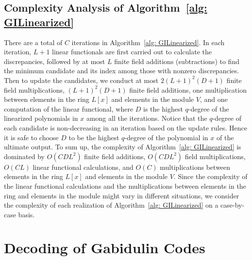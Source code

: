 \documentclass[11pt,onecolumn,draftcls]{IEEEtran}
\begin{document}
\subsection{Complexity Analysis of Algorithm~\ref{alg: GILinearized}} \label{section: ComplexityGeneral}
There are a total of $C$ iterations in Algorithm~\ref{alg: GILinearized}. In each iteration, $L+1$ linear functionals are first carried out to calculate the discrepancies, followed by at most $L$ finite field additions (subtractions) to find the minimum candidate and its index among those with nonzero discrepancies. Then to update the candidates, we conduct at most $2(L+1)^2 (D+1)$ finite field multiplications, $(L+1)^2 (D+1)$ finite field additions, one multiplication between elements in the ring $L[x]$ and elements in the module $V$, and one computation of the linear functional, where $D$ is the highest $q$-degree of the linearized polynomials in $x$ among all the iterations. Notice that the $q$-degree of each candidate is non-decreasing in an iteration based on the update rules. Hence it is safe to choose $D$ to be the highest $q$-degree of the polynomial in $x$ of the ultimate output. To sum up, the complexity of Algorithm~\ref{alg: GILinearized} is dominated by $O(CDL^2)$ finite field additions, $O(CDL^2)$ field multiplications, $O(CL)$ linear functional calculations, and $O(C)$ multiplications between elements in the ring $L[x]$ and elements in the module $V$. Since the complexity of the  linear functional calculations and the multiplications between elements in the ring and elements in the module might vary in different situations, we consider the complexity of each realization of Algorithm~\ref{alg: GILinearized} on a case-by-case basis.

\section{Decoding of Gabidulin Codes}
\label{sec: GeneralGb}
\end{document}

